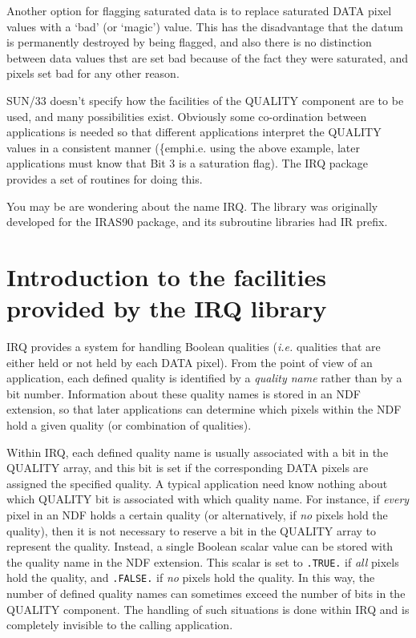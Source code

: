 \documentclass[twoside,11pt]{article}
\newcommand{\xlabel}[1]{}
\renewcommand{\_}{\texttt{\symbol{95}}}
\begin{document}
Another option for flagging saturated data is to replace saturated DATA
pixel values with a `bad' (or `magic') value. This has the disadvantage
that the datum is permanently destroyed by being flagged, and also there
is no distinction between data values thst are set bad because of the
fact they were saturated, and pixels set bad for any other reason. 

SUN/33 doesn't specify how the facilities of the QUALITY component are to
be used, and many possibilities exist. Obviously some co-ordination
between applications is needed so that different applications interpret
the QUALITY values in a consistent manner (\{emph{i.e.} using the above
example, later applications must know that Bit 3 is a saturation flag).
The IRQ package provides a set of routines for doing this.

You may be are wondering about the name IRQ.  The library was originally
developed for the IRAS90 package, and its subroutine libraries had IR
prefix.

\section {\xlabel{SEC:IRQ}Introduction to the facilities provided by the
IRQ library}
\label {SEC:IRQ}

IRQ provides a system for handling Boolean qualities (\emph{i.e.}
qualities that are either held or not held by each DATA pixel).  From the
point of view of an application, each defined quality is identified by a
{\em quality name} rather than by a bit number. Information about these
quality names is stored in an NDF extension, so that later applications
can determine which pixels within the NDF hold a given quality (or
combination of qualities). 

Within IRQ, each defined quality name is usually associated with a bit in
the QUALITY array, and this bit is set if the corresponding DATA pixels
are assigned the specified quality. A typical application need know
nothing about which QUALITY bit is associated with which quality name.
For instance, if {\em every} pixel in an NDF holds a certain quality (or
alternatively, if {\em no} pixels hold the quality), then it is not
necessary to reserve a bit in the QUALITY array to represent the quality.
Instead, a single Boolean scalar value can be stored with the quality
name in the NDF extension. This scalar is set to {\tt .TRUE.} if {\em
all} pixels hold the quality, and {\tt .FALSE.} if {\em no} pixels hold
the quality. In this way, the number of defined quality names can
sometimes exceed the number of bits in the QUALITY component. The
handling of such situations is done within IRQ and is completely
invisible to the calling application. 
\end{document}

